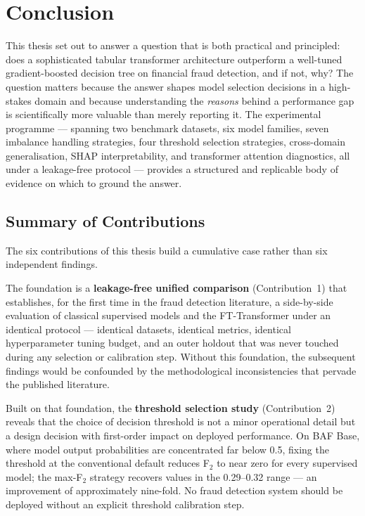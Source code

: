\chapter{Conclusion}
\label{sec:conclusion}

This thesis set out to answer a question that is both practical and principled: does a sophisticated tabular transformer architecture outperform a well-tuned gradient-boosted decision tree on financial fraud detection, and if not, why? The question matters because the answer shapes model selection decisions in a high-stakes domain and because understanding the \emph{reasons} behind a performance gap is scientifically more valuable than merely reporting it. The experimental programme — spanning two benchmark datasets, six model families, seven imbalance handling strategies, four threshold selection strategies, cross-domain generalisation, SHAP interpretability, and transformer attention diagnostics, all under a leakage-free protocol — provides a structured and replicable body of evidence on which to ground the answer.

\section{Summary of Contributions}
\label{sec:contributions_summary}

The six contributions of this thesis build a cumulative case rather than six independent findings.

The foundation is a \textbf{leakage-free unified comparison} (Contribution~1) that establishes, for the first time in the fraud detection literature, a side-by-side evaluation of classical supervised models and the FT-Transformer under an identical protocol — identical datasets, identical metrics, identical hyperparameter tuning budget, and an outer holdout that was never touched during any selection or calibration step. Without this foundation, the subsequent findings would be confounded by the methodological inconsistencies that pervade the published literature.

Built on that foundation, the \textbf{threshold selection study} (Contribution~2) reveals that the choice of decision threshold is not a minor operational detail but a design decision with first-order impact on deployed performance. On BAF Base, where model output probabilities are concentrated far below 0.5, fixing the threshold at the conventional default reduces F$_2$ to near zero for every supervised model; the max-F$_2$ strategy recovers values in the 0.29--0.32 range — an improvement of approximately nine-fold. No fraud detection system should be deployed without an explicit threshold calibration step.

